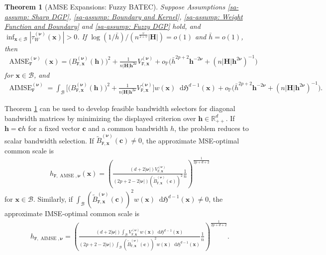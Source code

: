 \documentclass[10pt]{article}
\newtheorem{thm}{Theorem}
\renewcommand{\P}{\mathbb{P}}
\newcommand{\Haus}{\mathfrak{H}}
\newcommand{\dif}{\mathop{}\!\mathrm{d}}
\newcommand{\bc}{\mathbf{c}}
\newcommand{\bh}{\mathbf{h}}
\newcommand{\bH}{\mathbf{H}}
\newcommand{\bx}{\mathbf{x}}
\newcommand{\bnu}{\boldsymbol{\nu}}
\newcommand{\B}{\mathcal{B}}
\begin{document}
\begin{thm}[AMSE Expansions: Fuzzy BATEC]\label{sa-thm: MSE Expansions: Fuzzy BATEC}
    Suppose Assumptions \ref{sa-assump: Sharp DGP}, \ref{sa-assump: Boundary and Kernel}, \ref{sa-assump: Weight Function and Boundary} and \ref{sa-assump: Fuzzy DGP} hold, and $\inf_{\bx\in\B}|\tau_W^{(\bnu)}(\bx)|>0$. If $\log(1/\bar{h})/(n^{\frac{v}{2+v}} |\bH|) = o(1)$ and $\bar{h} = o(1)$, then
    \begin{align*}
        \operatorname{AMSE}_{\mathtt{F}}^{(\bnu)}(\bx)
        = \big(B_{\mathtt{F},\bx}^{(\bnu)}(\bh)\big)^2
          + \frac{1}{n|\bH|\bh^{2\bnu}} V_{\mathtt{F},\bx}^{(\bnu)}
          + o_{\P} \big(\bar{h}^{2p+2}\bh^{-2\bnu} + (n|\bH|\bh^{2\bnu})^{-1}\big)
    \end{align*}
    for $\bx \in \B$, and
    \begin{align*}
        \operatorname{AIMSE}_{\mathtt{F}}^{(\bnu)}
        = \int_{\B} \Big[ \big(B_{\mathtt{F},\bx}^{(\bnu)}(\bh)\big)^2
           + \frac{1}{n|\bH|\bh^{2\bnu}} V_{\mathtt{F},\bx}^{(\bnu)} \Big] w(\bx) \dif\Haus^{d-1}(\bx)
           + o_{\P} \big(\bar{h}^{2p+2}\bh^{-2\bnu} + (n|\bH|\bh^{2\bnu})^{-1}\big).
    \end{align*}
\end{thm}

Theorem \ref{sa-thm: MSE Expansions: Fuzzy BATEC} can be used to develop feasible bandwidth selectors for diagonal bandwidth matrices by minimizing the displayed criterion over $\bh\in\mathbb{R}_{++}^d$. If $\bh=\bc h$ for a fixed vector $\bc$ and a common bandwidth $h$, the problem reduces to scalar bandwidth selection. If $\widetilde B_{\mathtt{F},\bx}^{(\bnu)}(\bc) \neq 0$, the approximate MSE-optimal common scale is
\begin{align*}
    h_{\mathtt{F},\operatorname{AMSE},\bnu}(\bx)
    = \left(\frac{(d + 2|\bnu|) V_{\mathtt{F},\bx}^{(\bnu)}}
                 {(2p+2 - 2 |\bnu|) (\widetilde B_{\mathtt{F},\bx}^{(\bnu)}(\bc))^2} \frac{1}{n}\right)^{\frac{1}{2p+d+2}}
\end{align*}
for $\bx \in \B$. Similarly, if $\int_{\B} (\widetilde B_{\mathtt{F},\bx}^{(\bnu)}(\bc))^2 w(\bx)\dif\Haus^{d-1}(\bx) \neq 0$, the approximate IMSE-optimal common scale is
\begin{align*}
    h_{\mathtt{F},\operatorname{AIMSE},\bnu}
    = \left(\frac{(d + 2 |\bnu|) \int_{\B} V_{\mathtt{F},\bx}^{(\bnu)} w(\bx)\dif\Haus^{d-1}(\bx)}
                 {(2p+2 - 2|\bnu|) \int_{\B} (\widetilde B_{\mathtt{F},\bx}^{(\bnu)}(\bc))^2 w(\bx) \dif\Haus^{d-1}(\bx)} \frac{1}{n}\right)^{\frac{1}{2p+d+2}}.
\end{align*}
\end{document}
